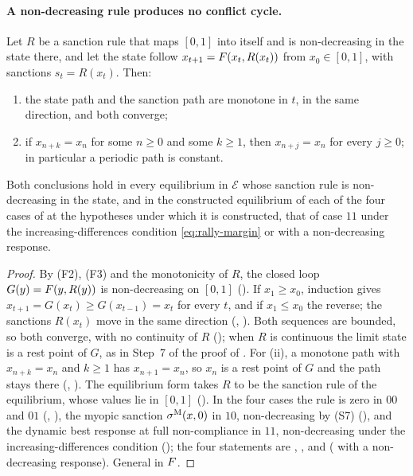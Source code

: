 \paragraph{A non-decreasing rule produces no conflict cycle.}
\begin{proposition}
\label{prop:no-cycles}
Let $R$ be a sanction rule that maps $[0,1]$ into itself and is
non-decreasing in the state there, and let the state follow
$x_{t+1}=F(x_t,R(x_t))$ from $x_0\in[0,1]$, with sanctions $s_t=R(x_t)$. Then:
\begin{enumerate}[label=(\roman*)]
\item the state path and the sanction path are monotone in $t$, in the same
direction, and both converge;
\item if $x_{n+k}=x_n$ for some $n\ge0$ and some $k\ge1$, then $x_{n+j}=x_n$ for
every $j\ge0$; in particular a periodic path is constant.
\end{enumerate}
Both conclusions hold in every equilibrium in $\mathcal E$ whose sanction rule is
non-decreasing in the state, and in the constructed equilibrium of each of the four cases of
 at the hypotheses under which it is constructed, that of case
$11$ under the increasing-differences condition \eqref{eq:rally-margin} or with a non-decreasing
response.
\end{proposition}

\begin{proof}
By \textup{(F2)}, \textup{(F3)} and the monotonicity of $R$, the closed loop
$G(y)=F(y,R(y))$ is non-decreasing on $[0,1]$ (). If
$x_1\ge x_0$, induction gives $x_{t+1}=G(x_t)\ge G(x_{t-1})=x_t$ for every $t$,
and if $x_1\le x_0$ the reverse; the sanctions $R(x_t)$ move in the same
direction (,
). Both sequences are
bounded, so both converge, with no continuity of $R$
(); when $R$ is continuous the limit state
is a rest point of $G$, as in Step~7 of the proof of
. For (ii), a monotone path with $x_{n+k}=x_n$ and
$k\ge1$ has $x_{n+1}=x_n$, so $x_n$ is a rest point of $G$ and the path stays
there (, ). The
equilibrium form takes $R$ to be the sanction rule of the equilibrium, whose values lie in $[0,1]$
(). In the four cases the rule is zero in $00$ and
$01$ (, ), the myopic
sanction $\sigma^{\mathrm{M}}(x,0)$ in $10$, non-decreasing by \textup{(S7)}
(), and the dynamic best response at full non-compliance in $11$,
non-decreasing under the increasing-differences condition ();
the four statements are , ,
 and 
( with a non-decreasing response). General in $F$.
\end{proof}

